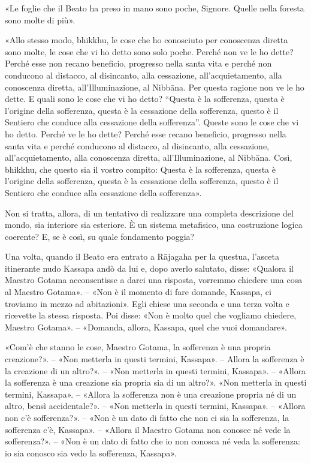 «Le foglie che il Beato ha preso in mano sono poche, Signore. Quelle nella
foresta sono molte di più».

«Allo stesso modo, bhikkhu, le cose che ho conosciuto per conoscenza diretta
sono molte, le cose che vi ho detto sono solo poche. Perché non ve le ho dette?
Perché esse non recano beneficio, progresso nella santa vita e perché non
conducono al distacco, al disincanto, alla cessazione, all’acquietamento, alla
conoscenza diretta, all’Illuminazione, al Nibbāna. Per questa ragione non ve le
ho dette. E quali sono le cose che vi ho detto? “Questa è la sofferenza, questa
è l’origine della sofferenza, questa è la cessazione della sofferenza, questo è
il Sentiero che conduce alla cessazione della sofferenza”. Queste sono le cose
che vi ho detto. Perché ve le ho dette? Perché esse recano beneficio, progresso
nella santa vita e perché conducono al distacco, al disincanto, alla cessazione,
all’acquietamento, alla conoscenza diretta, all’Illuminazione, al Nibbāna. Così,
bhikkhu, che questo sia il vostro compito: Questa è la sofferenza, questa è
l’origine della sofferenza, questa è la cessazione della sofferenza, questo è il
Sentiero che conduce alla cessazione della sofferenza».


 Non si tratta, allora, di un tentativo di realizzare
una completa descrizione del mondo, sia interiore sia esteriore. È un sistema
metafisico, una costruzione logica coerente? E, se è così, su quale fondamento
poggia?

\label{pag230}%
 Una volta, quando il Beato era entrato a Rājagaha per la
questua, l’asceta itinerante nudo Kassapa andò da lui e, dopo averlo salutato,
disse: «Qualora il Maestro Gotama acconsentisse a darci una risposta, vorremmo
chiedere una cosa al Maestro Gotama». – «Non è il momento di fare domande,
Kassapa, ci troviamo in mezzo ad abitazioni». Egli chiese una seconda e una
terza volta e ricevette la stessa risposta. Poi disse: «Non è molto quel che
vogliamo chiedere, Maestro Gotama». – «Domanda, allora, Kassapa, quel che vuoi
domandare».

«Com’è che stanno le cose, Maestro Gotama, la sofferenza è una propria
creazione?». – «Non metterla in questi termini, Kassapa». – Allora la sofferenza
è la creazione di un altro?». – «Non metterla in questi termini, Kassapa». –
«Allora la sofferenza è una creazione sia propria sia di un altro?». «Non
metterla in questi termini, Kassapa». – «Allora la sofferenza non è una
creazione propria né di un altro, bensì accidentale?». – «Non metterla in questi
termini, Kassapa». – «Allora non c’è sofferenza?». – «Non è un dato di fatto che
non ci sia la sofferenza, la sofferenza c’è, Kassapa». – «Allora il Maestro
Gotama non conosce né vede la sofferenza?». – «Non è un dato di fatto che io non
conosca né veda la sofferenza: io sia conosco sia vedo la sofferenza, Kassapa».

